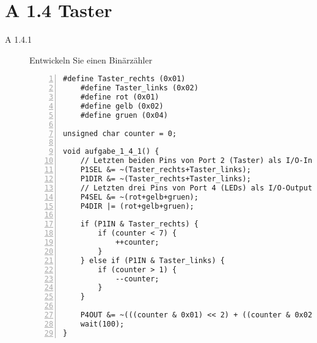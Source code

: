 \documentclass[11pt,a4paper,ngerman]{article}
\begin{document}
\section*{A 1.4 Taster}
\begin{description}
\item[A 1.4.1] Entwickeln Sie einen Binärzähler \\

\begin{lstlisting}[numbers=left]
	#define Taster_rechts (0x01)
	#define Taster_links (0x02)
	#define rot (0x01)
	#define gelb (0x02)
	#define gruen (0x04)
	
unsigned char counter = 0;
	
void aufgabe_1_4_1() {
	// Letzten beiden Pins von Port 2 (Taster) als I/O-Input verwenden
	P1SEL &= ~(Taster_rechts+Taster_links);
	P1DIR &= ~(Taster_rechts+Taster_links);
	// Letzten drei Pins von Port 4 (LEDs) als I/O-Output verwenden
	P4SEL &= ~(rot+gelb+gruen);
	P4DIR |= (rot+gelb+gruen);
	
	if (P1IN & Taster_rechts) {
		if (counter < 7) {
			++counter;
		}
	} else if (P1IN & Taster_links) {
		if (counter > 1) {
			--counter;
		}
	}
	
	P4OUT &= ~(((counter & 0x01) << 2) + ((counter & 0x02) << 1) + (counter & 0x04))
	wait(100);
}
\end{lstlisting}
\end{description}
\label{LastPage}
\end{document}
